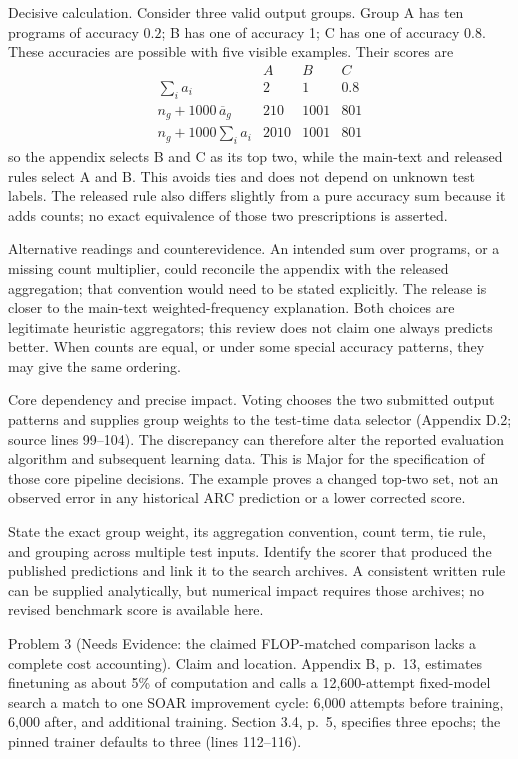 \documentclass[10pt]{article}
\begin{document}
Decisive calculation. Consider three valid output groups. Group A has ten programs of accuracy \(0.2\); B has one of accuracy 1; C has one of accuracy \(0.8\). These accuracies are possible with five visible examples. Their scores are \[\begin{array}{c|rrr}
 & A&B&C\\ \hline
\sum_i a_i &2&1&0.8\\
n_g+1000\,\overline a_g &210&1001&801\\
n_g+1000\sum_i a_i &2010&1001&801
\end{array}\] so the appendix selects B and C as its top two, while the main-text and released rules select A and B. This avoids ties and does not depend on unknown test labels. The released rule also differs slightly from a pure accuracy sum because it adds counts; no exact equivalence of those two prescriptions is asserted.\par
Alternative readings and counterevidence. An intended sum over programs, or a missing count multiplier, could reconcile the appendix with the released aggregation; that convention would need to be stated explicitly. The release is closer to the main-text weighted-frequency explanation. Both choices are legitimate heuristic aggregators; this review does not claim one always predicts better. When counts are equal, or under some special accuracy patterns, they may give the same ordering.\par
Core dependency and precise impact. Voting chooses the two submitted output patterns and supplies group weights to the test-time data selector (Appendix D.2; source lines 99–104). The discrepancy can therefore alter the reported evaluation algorithm and subsequent learning data. This is Major for the specification of those core pipeline decisions. The example proves a changed top-two set, not an observed error in any historical ARC prediction or a lower corrected score.\par
State the exact group weight, its aggregation convention, count term, tie rule, and grouping across multiple test inputs. Identify the scorer that produced the published predictions and link it to the search archives. A consistent written rule can be supplied analytically, but numerical impact requires those archives; no revised benchmark score is available here.\par
Problem 3 (Needs Evidence: the claimed FLOP-matched comparison lacks a complete cost accounting).  Claim and location. Appendix B, p. 13, estimates finetuning as about 5\% of computation and calls a 12,600-attempt fixed-model search a match to one SOAR improvement cycle: 6,000 attempts before training, 6,000 after, and additional training. Section 3.4, p. 5, specifies three epochs; the pinned trainer defaults to three (lines 112–116).\par
\end{document}
